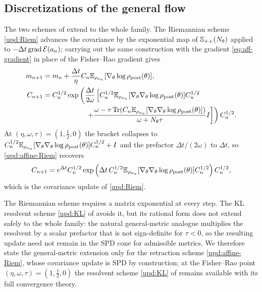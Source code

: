 \subsection{Discretizations of the general flow}

The two schemes of  extend to the whole family. The Riemannian scheme \eqref{upd:Riem} advances the covariance by the exponential map of $\mathbb{S}_{++}(N_\theta)$ applied to $-\Delta t \operatorname{grad} \mathcal{E}(a_n)$; carrying out the same construction with the gradient \eqref{eq:aff-gradient} in place of the Fisher--Rao gradient gives
\begin{equation}\label{upd:affine-Riem}
    \begin{aligned}
        m_{n+1} &= m_n + \frac{\Delta t}{\eta} C_n \mathbb{E}_{\rho_{a_n}} [\nabla_\theta \log \rho_{\mathrm{post}} (\theta)], \\
        C_{n+1} &= C_n^{1/2} \exp \left(\frac{\Delta t}{2\omega} \left[ C_n^{1/2} \mathbb{E}_{\rho_{a_n}} [\nabla_\theta \nabla_\theta \log \rho_{\mathrm{post}} (\theta)] C_n^{1/2} \right. \right. \\
        &\qquad\qquad\qquad \left. \left. + \frac{\omega - \tau \operatorname{Tr}(C_n \mathbb{E}_{\rho_{a_n}} [\nabla_\theta \nabla_\theta \log \rho_{\mathrm{post}} (\theta)])}{\omega + N_\theta \tau} I \right] \right) C_n^{1/2}.
    \end{aligned}
\end{equation}
At $(\eta, \omega, \tau) = (1, \frac{1}{2}, 0)$ the bracket collapses to $C_n^{1/2} \mathbb{E}_{\rho_{a_n}} [\nabla_\theta \nabla_\theta \log \rho_{\mathrm{post}} (\theta)] C_n^{1/2} + I$ and the prefactor $\Delta t/(2\omega)$ to $\Delta t$, so \eqref{upd:affine-Riem} recovers
\begin{equation*}
    C_{n+1} = e^{\Delta t} C_n^{1/2} \exp \left( \Delta t \, C_n^{1/2} \mathbb{E}_{\rho_{a_n}} [\nabla_\theta \nabla_\theta \log \rho_{\mathrm{post}} (\theta)] C_n^{1/2} \right) C_n^{1/2},
\end{equation*}
which is the covariance update of \eqref{upd:Riem}.

The Riemannian scheme requires a matrix exponential at every step. The KL resolvent scheme \eqref{upd:KL} of  avoids it, but its rational form does not extend safely to the whole family: the natural general-metric analogue multiplies the resolvent by a scalar prefactor that is not sign-definite for $\tau < 0$, so the resulting update need not remain in the SPD cone for admissible metrics. We therefore state the general-metric extension only for the retraction scheme \eqref{upd:affine-Riem}, whose covariance update is SPD by construction; at the Fisher--Rao point $(\eta, \omega, \tau) = (1, \frac{1}{2}, 0)$ the resolvent scheme \eqref{upd:KL} of  remains available with its full convergence theory.

